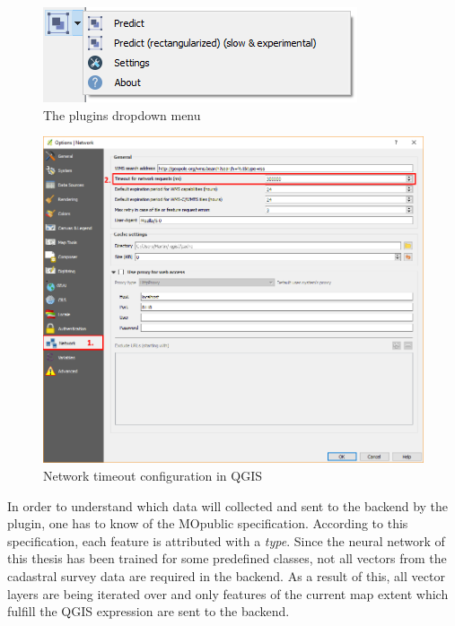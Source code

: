 \begin{figure}[H]
    \centering
	\includegraphics[width=0.5\linewidth]{chapters/introduction/images/plugin_dropdown.png}
	\caption{The plugins dropdown menu}
	\label{fig:introduction:plugin_dropdown}
\end{figure}

\begin{figure}[H]
    \centering
	\includegraphics[width=0.8\linewidth]{chapters/introduction/images/qgs_timeout.png}
	\caption{Network timeout configuration in QGIS}
	\label{fig:introduction:qgis_timeout}
\end{figure}

In order to understand which data will collected and sent to the backend by the plugin, one has to know of the MOpublic \cite{mopublic} specification. According to this specification, each feature is attributed with a \textit{type}. Since the neural network of this thesis has been trained for some predefined classes, not all vectors from the cadastral survey data are required in the backend. As a result of this, all vector layers are being iterated over and only features of the current map extent which fulfill the QGIS expression \textbf{} are sent to the backend.